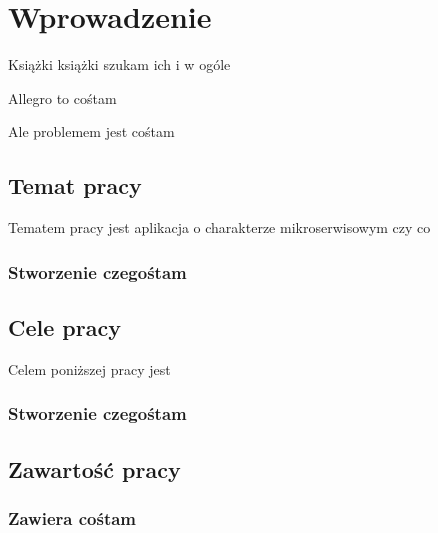 \chapter{Wprowadzenie}
\label{cha:wprowadzenie}

Książki książki szukam ich i w ogóle

Allegro to cośtam

Ale problemem jest cośtam


\section{Temat pracy}
\label{sec:tematPracy}

Tematem pracy jest aplikacja o charakterze mikroserwisowym czy co

\subsection{Stworzenie czegośtam}




\section{Cele pracy}
\label{sec:celePracy}


Celem poniższej pracy jest 

\subsection{Stworzenie czegośtam}




\section{Zawartość pracy}
\label{sec:zawartoscPracy}

\subsection{Zawiera cośtam}


















